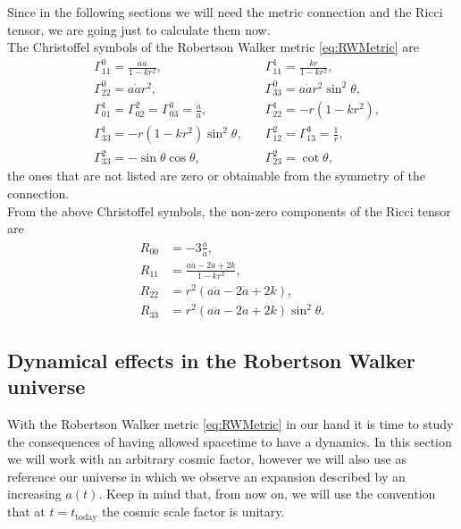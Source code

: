 Since in the following sections we will need the metric connection and the Ricci tensor, we are going just to calculate them now.\\
The Christoffel symbols of the Robertson Walker metric \eqref{eq:RWMetric} are
\begin{align}
    &\Gamma^0_{11}=\frac{a\dot{a}}{1-kr^2}, \quad&\Gamma^1_{11}=\frac{kr}{1-kr^2},\nonumber\\&\Gamma^0_{22}=a\dot{a}r^2, \quad&\Gamma^0_{33}=a\dot{a}r^2\sin^2\theta,\nonumber\\&\Gamma^1_{01}=\Gamma^2_{02}=\Gamma^3_{03}=\frac{\dot{a}}{a}, \quad &\Gamma^1_{22}=-r(1-kr^2),\nonumber\\&\Gamma^1_{33}=-r(1-kr^2)\sin^2\theta, \quad &\Gamma^2_{12}=\Gamma^3_{13}=\frac{1}{r},\nonumber\\&\Gamma^2_{33}=-\sin\theta\cos\theta, \quad &\Gamma^2_{23}=\cot\theta,\label{eq:RWChristoffel}
\end{align}
the ones that are not listed are zero or obtainable from the symmetry of the connection.\\
From the above Christoffel symbols, the non-zero components of the Ricci tensor are
\begin{align}
    R_{00}&=-3\frac{\ddot a}{a},\nonumber\\
    R_{11}&=\frac{a\ddot{a}-2\dot a+2k}{1-kr^2},\nonumber\\
    R_{22}&=r^2(a\ddot{a}-2\dot a+2k),\nonumber\\
    R_{33}&=r^2(a\ddot{a}-2\dot a+2k)\sin^2\theta.\label{eq:RWRicci}
\end{align}
\subsection{Dynamical effects in the Robertson Walker universe}
With the Robertson Walker metric \eqref{eq:RWMetric} in our hand it is time to study the consequences of having allowed spacetime to have a dynamics. In this section we will work with an arbitrary cosmic factor, however we will also use as reference our universe in which we observe an expansion described by an increasing $a(t)$. Keep in mind that, from now on, we will use the convention that at $t=t_\text{today}$ the cosmic scale factor is unitary.
